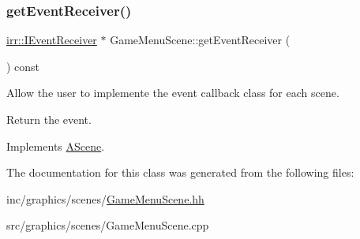 \subsubsection{\texorpdfstring{get\+Event\+Receiver()}{getEventReceiver()}}
{\footnotesize\ttfamily \hyperlink{classirr_1_1IEventReceiver}{irr\+::\+I\+Event\+Receiver} $\ast$ Game\+Menu\+Scene\+::get\+Event\+Receiver (\begin{DoxyParamCaption}{ }\end{DoxyParamCaption}) const\hspace{0.3cm}{\ttfamily [virtual]}}



Allow the user to implemente the event callback class for each scene. 

Return the event. 

Implements \hyperlink{classAScene_af521e5e6d30a5d2e5d30eb333e4d3abd}{A\+Scene}.



The documentation for this class was generated from the following files\+:\begin{DoxyCompactItemize}
\item 
inc/graphics/scenes/\hyperlink{GameMenuScene_8hh}{Game\+Menu\+Scene.\+hh}\item 
src/graphics/scenes/Game\+Menu\+Scene.\+cpp\end{DoxyCompactItemize}
